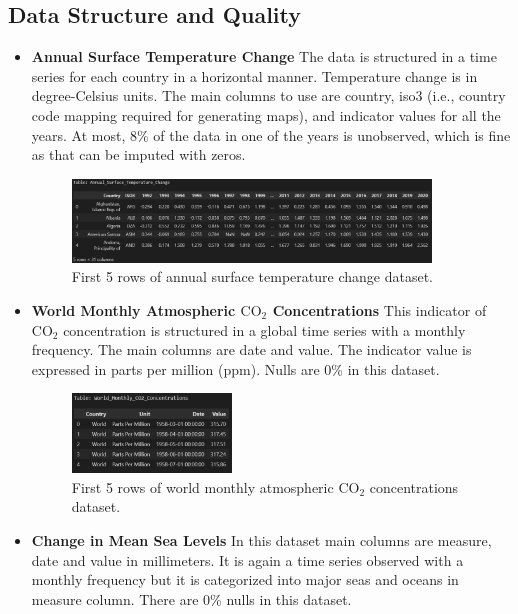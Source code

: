 \documentclass[a4paper,11pt]{article}
\begin{document}
\subsection{Data Structure and Quality}
\begin{itemize}
    \item \textbf{Annual Surface Temperature Change} The data is structured in a time series for each country in a horizontal manner. Temperature change is in degree-Celsius units. The main columns to use are country, iso3 (i.e., country code mapping required for generating maps), and indicator values for all the years. At most, 8\% of the data in one of the years is unobserved, which is fine as that can be imputed with zeros.

    \begin{figure}[ht!]
        \centering
        \includegraphics[width=0.9\textwidth]{pictures/atmos.png}
        \caption{First 5 rows of annual surface temperature change dataset.}
        \label{fig:dataset1}
    \end{figure}
    
    \item \textbf{World Monthly Atmospheric \(\text{CO}_2\) Concentrations} This indicator of \(\text{CO}_2\) concentration is structured in a global time series with a monthly frequency. The main columns are date and value. The indicator value is expressed in parts per million (ppm). Nulls are 0\% in this dataset.

    \begin{figure}[ht!]
        \centering
        \includegraphics[width=0.4\textwidth]{pictures/co2.png}
        \caption{First 5 rows of world monthly atmospheric \(\text{CO}_2\) concentrations dataset.}
        \label{fig:dataset2}
    \end{figure}

    \item \textbf{Change in Mean Sea Levels} In this dataset main columns are measure, date and value in millimeters. It is again a time series observed with a monthly frequency but it is categorized into major seas and oceans in measure column. There are 0\% nulls in this dataset.


\end{itemize}
\end{document}
